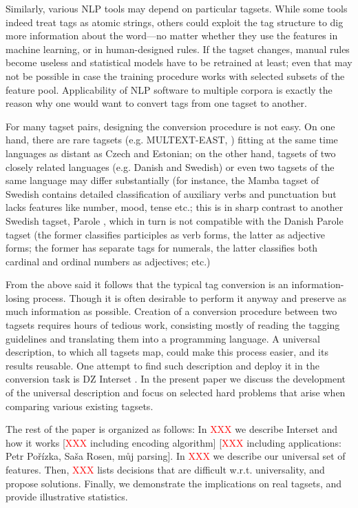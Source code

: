 \documentclass[11pt]{article}
\newcommand{\XXX}{\textcolor{red}{XXX }} %
\begin{document}
Similarly, various NLP tools may depend on particular tagsets. While some tools indeed treat tags as atomic strings, others could exploit the tag structure to dig more information about the word—no matter whether they use the features in machine learning, or in human-designed rules. If the tagset changes, manual rules become useless and statistical models have to be retrained at least; even that may not be possible in case the training procedure works with selected subsets of the feature pool. Applicability of NLP software to multiple corpora is exactly the reason why one would want to convert tags from one tagset to another.

For many tagset pairs, designing the conversion procedure is not easy. On one hand, there are rare tagsets (e.g. MULTEXT-EAST, \citet{multext-east}) fitting at the same time languages as distant as Czech and Estonian; on the other hand, tagsets of two closely related languages (e.g. Danish and Swedish) or even two tagsets of the same language may differ substantially (for instance, the Mamba tagset of Swedish \citep{talbanken} contains detailed classification of auxiliary verbs and punctuation but lacks features like number, mood, tense etc.; this is in sharp contrast to another Swedish tagset, Parole \citep{parolesv}, which in turn is not compatible with the Danish Parole \citep{paroleda} tagset (the former classifies participles as verb forms, the latter as adjective forms; the former has separate tags for numerals, the latter classifies both cardinal and ordinal numbers as adjectives; etc.)

From the above said it follows that the typical tag conversion is an information-losing process. Though it is often desirable to perform it anyway and preserve as much information as possible. Creation of a conversion procedure between two tagsets requires hours of tedious work, consisting mostly of reading the tagging guidelines and translating them into a programming language. A universal description, to which all tagsets map, could make this process easier, and its results reusable. One attempt to find such description and deploy it in the conversion task is DZ Interset \citep{biblio:ZeReusableTagset2008}. In the present paper we discuss the development of the universal description and focus on selected hard problems that arise when comparing various existing tagsets.

The rest of the paper is organized as follows: In \XXX we describe Interset and how it works [\XXX including encoding algorithm] [\XXX including applications: Petr Pořízka, Saša Rosen, můj parsing]. In \XXX we describe our universal set of features. Then, \XXX lists decisions that are difficult w.r.t. universality, and propose solutions. Finally, we demonstrate the implications on real tagsets, and provide illustrative statistics.
\end{document}
